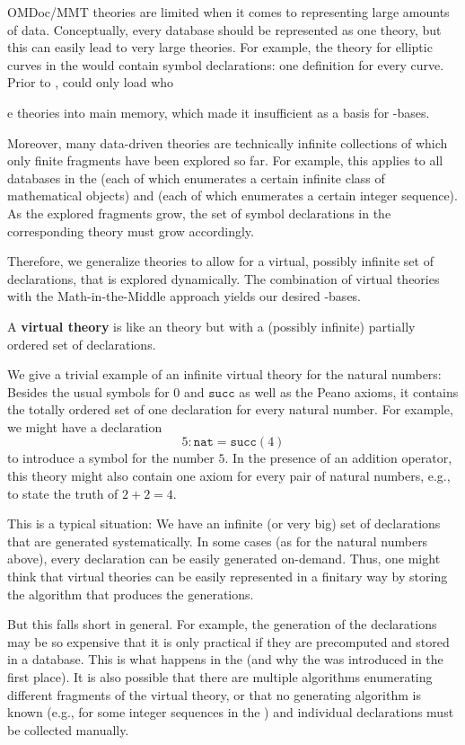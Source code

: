 OMDoc/MMT theories are limited when it comes to representing large amounts of data.
Conceptually, every database should be represented as one theory, but this can easily lead to very large theories.
For example, the theory for elliptic curves in the \LMFDB would contain  symbol declarations: one definition for every curve.
Prior to \pn, \MMT could only load who{e theories into main memory, which made it insufficient as a basis for \DKS-bases.

Moreover, many data-driven theories are technically infinite collections of which only finite fragments have been explored so far.
For example, this applies to all databases in the \LMFDB (each of which enumerates a certain infinite class of mathematical objects) and \OEIS (each of which enumerates a certain integer sequence).
As the explored fragments grow, the set of symbol declarations in the corresponding \MMT theory must grow accordingly.

Therefore, we generalize \MMT theories to allow for a virtual, possibly infinite set of declarations, that is explored dynamically.
The combination of virtual theories with the Math-in-the-Middle approach yields our desired \DKS-bases.

\begin{mydef}
  A \textbf{virtual theory} is like an \MMT theory but with a (possibly infinite) partially ordered set of declarations.
\end{mydef}

We give a trivial example of an infinite virtual theory for the natural numbers:
Besides the usual symbols for $0$ and $\mathtt{succ}$ as well as the Peano axioms, it contains the totally ordered set of one declaration for every natural number.
For example, we might have a declaration
 \[5:\mathtt{nat}=\mathtt{succ}(4)\]
to introduce a symbol for the number $5$.
In the presence of an addition operator, this theory might also contain one axiom for every pair of natural numbers, e.g., to state the truth of $2+2=4$.

This is a typical situation: We have an infinite (or very big) set of declarations that are generated systematically.
In some cases (as for the natural numbers above), every declaration can be easily generated on-demand.
Thus, one might think that virtual theories can be easily represented in a finitary way by storing the algorithm that produces the generations.

But this falls short in general.
For example, the generation of the declarations may be so expensive that it is only practical if they are precomputed and stored in a database.
This is what happens in the \LMFDB (and why the \LMFDB was introduced in the first place).
It is also possible that there are multiple algorithms enumerating different fragments of the virtual theory, or that no generating algorithm is known (e.g., for some integer sequences in the \OEIS) and individual declarations must be collected manually.

}
